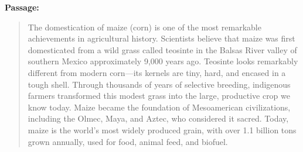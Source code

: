 \documentclass[10pt,a4paper]{article}
\begin{document}
\textbf{Passage:}

\begin{quote}
\small
The domestication of maize (corn) is one of the most remarkable
achievements in agricultural history. Scientists believe that
maize was first domesticated from a wild grass called teosinte
in the Balsas River valley of southern Mexico approximately
9,000 years ago. Teosinte looks remarkably different from
modern corn---its kernels are tiny, hard, and encased in a
tough shell. Through thousands of years of selective breeding,
indigenous farmers transformed this modest grass into the large,
productive crop we know today. Maize became the foundation of
Mesoamerican civilizations, including the Olmec, Maya, and
Aztec, who considered it sacred. Today, maize is the world's
most widely produced grain, with over 1.1 billion tons grown
annually, used for food, animal feed, and biofuel.
\end{quote}
\end{document}
